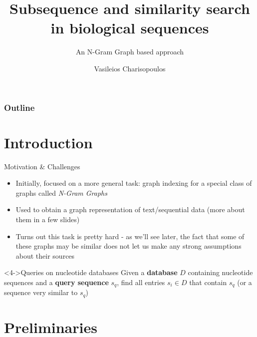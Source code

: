 \documentclass[9pt]{beamer}
\title{Subsequence and similarity search in biological sequences}
\subtitle{An N-Gram Graph based approach}
\author[Vasileios Charisopoulos]{Vasileios Charisopoulos}
\begin{document}
\begin{frame}
	\titlepage
\end{frame}

\begin{frame}
\frametitle{Outline}
\tableofcontents
\end{frame}

\section{Introduction}
\begin{frame}{Motivation \& Challenges}
	\begin{itemize}
		\item<1-> Initially, focused on a more general task: graph indexing for a special class of graphs called \textit{N-Gram Graphs}
		\item<2-> Used to obtain a graph representation of text/sequential data (more about them in a few slides)
		\item<3-> Turns out this task is pretty hard - as we'll see later, the fact that some of these graphs may be similar does not let us make any strong assumptions about their sources
	\end{itemize}
	\begin{block}<4->{Queries on nucleotide databases}
	{
			Given a \textbf{database} $D$ containing nucleotide sequences and a \textbf{query sequence} $s_q$, find all entries $s_i \in D$ that contain $s_q$ (or a sequence very similar to $s_q$)
	}
	\end{block}
\end{frame}

\section{Preliminaries}
\end{document}
